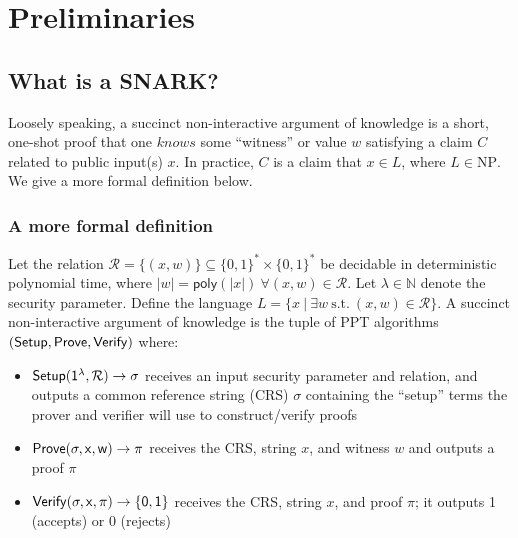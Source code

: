 \section{Preliminaries}

\subsection{What is a SNARK?}
\noindent Loosely speaking, a succinct non-interactive argument of knowledge is a short, one-shot proof that one $knows$ some ``witness'' or value $w$ satisfying a claim $C$ related to public input(s) $x$. In practice, $C$ is a claim that $x \in L$, where $L \in \text{NP}$. We give a more formal definition below.

\subsubsection{A more formal definition}
\noindent Let the relation $\mathcal{R} = \{(x, w)\} \subseteq \{0, 1\}^{*} \times \{0, 1\}^{*}$ be decidable in deterministic polynomial time, where $|w| = \mathsf{poly}(|x|)\ \forall (x, w) \in \mathcal{R}$. Let $\lambda \in \mathbb{N}$ denote the security parameter. Define the language $L = \{x\ |\ \exists w\ \text{s.t.}\ (x, w) \in \mathcal{R}\}$. A succinct non-interactive argument of knowledge is the tuple of PPT algorithms $(\sf{Setup}, \sf{Prove}, \sf{Verify})$ where:
\begin{itemize}
    \item $\sf{Setup}(1^{\lambda}, \mathcal{R}) \rightarrow \sigma$ receives an input security parameter and relation, and outputs a common reference string (CRS) $\sigma$ containing the ``setup'' terms the prover and verifier will use to construct/verify proofs
    \item $\sf{Prove}(\sigma, x, w) \rightarrow \pi$ receives the CRS, string $x$, and witness $w$ and outputs a proof $\pi$
    \item $\sf{Verify}(\sigma, x, \pi) \rightarrow \{0, 1\}$ receives the CRS, string $x$, and proof $\pi$; it outputs 1 (accepts) or 0 (rejects)
\end{itemize}

